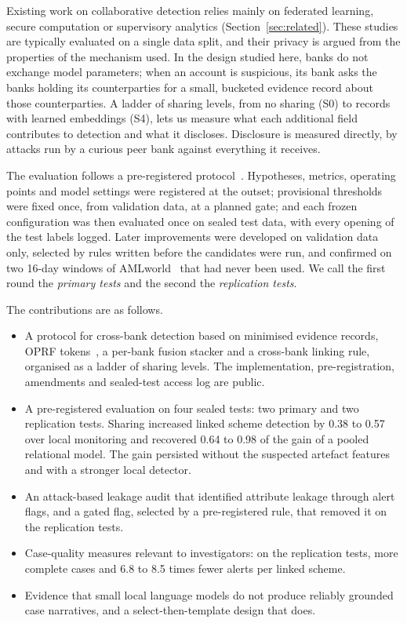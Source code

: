 \documentclass[conference]{IEEEtran}
\begin{document}
Existing work on collaborative detection relies mainly on federated learning, secure
computation or supervisory analytics (Section~\ref{sec:related}). These studies are
typically evaluated on a single data split, and their privacy is argued from the properties
of the mechanism used. In the design studied here, banks do not exchange model parameters; when an account is suspicious, its
bank asks the banks holding its counterparties for a small, bucketed evidence record about
those counterparties. A ladder of sharing levels, from no sharing (S0) to records with
learned embeddings (S4), lets us measure what each additional field contributes to
detection and what it discloses. Disclosure is measured directly, by attacks run by a
curious peer bank against everything it receives.

The evaluation follows a pre-registered protocol~\cite{nosek2018}. Hypotheses, metrics,
operating points and model settings were registered at the outset; provisional thresholds
were fixed once, from validation data, at a planned gate; and each frozen configuration was
then evaluated once on sealed test data, with every opening of the test labels logged. Later
improvements were developed on validation data only, selected by rules written before the
candidates were run, and confirmed on two 16-day windows of AMLworld~\cite{altman2023}
that had never been used. We call the first round the \emph{primary tests} and the second
the \emph{replication tests}.

The contributions are as follows.
\begin{itemize}
\item A protocol for cross-bank detection based on minimised evidence records, OPRF
tokens~\cite{rfc9497}, a per-bank fusion stacker and a cross-bank linking rule, organised
as a ladder of sharing levels. The implementation, pre-registration, amendments and
sealed-test access log are public.
\item A pre-registered evaluation on four sealed tests: two primary and two replication tests. Sharing increased
linked scheme detection by 0.38 to 0.57 over local monitoring and recovered 0.64 to 0.98 of
the gain of a pooled relational model. The gain persisted without the suspected artefact
features and with a stronger local detector.
\item An attack-based leakage audit that identified attribute leakage through alert flags,
and a gated flag, selected by a pre-registered rule, that removed it on the replication
tests.
\item Case-quality measures relevant to investigators: on the replication tests, more
complete cases and 6.8 to 8.5 times fewer alerts per linked scheme.
\item Evidence that small local language models do not produce reliably grounded case
narratives, and a select-then-template design that does.
\end{itemize}
\end{document}
